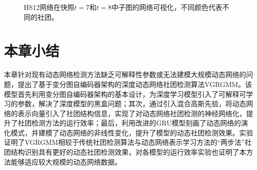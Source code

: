 \begin{figure}[htbp]
{    }
    \caption{HS12网络在快照$t=7$和$t=8$中子图的网络可视化，不同颜色代表不同的社团。}
    \label{fig:case}
\end{figure}






\section{本章小结\label{chap6:summary}}
本章针对现有动态网络检测方法缺乏可解释性参数或无法建模大规模动态网络的问题，提出了基于变分图自编码器架构的深度动态网络社团检测算法VGRGMM。该模型首先利用变分图自编码器架构的基本设计，为深度学习模型引入了可解释可学习的参数，解决了深度模型的黑盒问题；其次，通过引入混合高斯先验，将动态网络的表示向量引入了社团结构信息，实现了对动态网络社团检测的神经网络化，提升了社团检测方法的运行效率；最后，利用改进的GRU模型刻画了动态网络的演化模式，并建模了动态网络的非线性变化，提升了模型的动态社团检测效果。实验证明了VGRGMM相较于传统社团检测算法与动态网络表示学习方法的“两步法”社团结构识别具有更好的动态社团检测效果，对各模型的运行效率实验也证明了本方法能够适应较大规模的动态网络数据。

